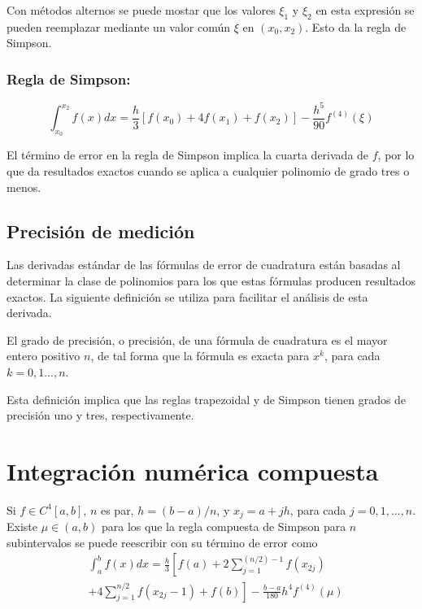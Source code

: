 Con métodos alternos se puede mostar que los valores $\xi_1$ y $\xi_2$ en esta expresión se pueden reemplazar mediante un valor común $\xi$ en $(x_0, x_2)$. Esto da la regla de Simpson.

\subsubsection{Regla de Simpson:}
\[ \int_{x_0}^{x_2} f(x) dx = \frac{h}{3} [f(x_0) + 4 f(x_1) + f(x_2)] - \frac{h^5}{90} f^{(4)}(\xi)\]

El término de error en la regla de Simpson implica la cuarta derivada de $f$, por lo que da resultados exactos cuando se aplica a cualquier polinomio de grado tres o menos.

\subsection{Precisión de medición}
Las derivadas estándar de las fórmulas de error de cuadratura están basadas al determinar la clase de polinomios para los que estas fórmulas producen resultados exactos. La siguiente definición se utiliza para facilitar el análisis de esta derivada.

\begin{definition}
    El grado de precisión, o precisión, de una fórmula de cuadratura es el mayor entero positivo $n$, de tal forma que la fórmula es exacta para $x^k$, para cada $k = 0,1...,n$.
\end{definition}

Esta definición implica que las reglas trapezoidal y de Simpson tienen grados de precisión uno y tres, respectivamente.

\section{Integración numérica compuesta}

\begin{theorem}
    Si $f \in C^4[a, b]$, $n$ es par, $h = (b - a)/n$, y $x_j = a + jh$, para cada $j = 0, 1,..., n$. Existe $\mu \in (a, b)$ para los que la regla compuesta de Simpson para $n$ subintervalos se puede reescribir con su término de error como
    \begin{align*}
        & \int_{a}^{b} f(x) dx = \frac{h}{3} \left[ f(a) + 2 \sum_{j = 1}^{(n/2)-1} f(x_{2j}) \right. \\
        & \left. + 4 \sum_{j = 1}^{n/2} f(x_{2j} - 1) + f(b) \right] - \frac{b - a}{180} h^4 f^{(4)} (\mu)
    \end{align*}
\end{theorem}

